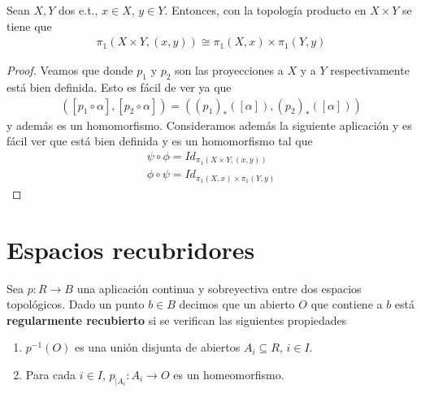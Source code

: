 \begin{teo}
    Sean $X,Y$ dos e.t., $x\in X$, $y\in Y$. Entonces, con la topología producto en $X\times Y$ se tiene que 
    \begin{gather*}
        \pi_1(X\times Y, (x,y)) \cong \pi_1(X,x) \times \pi_1(Y,y)
    \end{gather*}
    \begin{proof}
        Veamos que 
        donde $p_1$ y $p_2$ son las proyecciones a $X$ y a $Y$ respectivamente está bien definida. Esto es fácil de ver ya que 
        \begin{gather*}
            ([p_1 \circ \alpha], [p_2\circ \alpha]) = ((p_1)_*([\alpha]), (p_2)_*([\alpha]))
        \end{gather*}
        y además es un homomorfismo. Consideramos además la siguiente aplicación
        y es fácil ver que está bien definida y es un homomorfismo tal que
        \begin{gather*}
            \psi \circ \phi = Id_{\pi_1(X\times Y,(x,y))}\\
            \phi \circ \psi = Id_{\pi_1(X,x) \times \pi_1(Y,y)}
        \end{gather*}
    \end{proof}
\end{teo}

\section{Espacios recubridores}

\begin{definicion}
    Sea $p:R\to B$ una aplicación continua y sobreyectiva entre dos espacios topológicos. Dado un punto $b\in B$ decimos que un abierto $O$ que contiene a $b$ está \textbf{regularmente recubierto} si se verifican las siguientes propiedades
    \begin{enumerate}
        \item $p^{-1}(O)$ es una unión disjunta de abiertos $A_i\subseteq R$, $i\in I$.
        \item Para cada $i\in I$, $p_{|A_i}:A_i \to O$ es un homeomorfismo.
    \end{enumerate}
\end{definicion}

